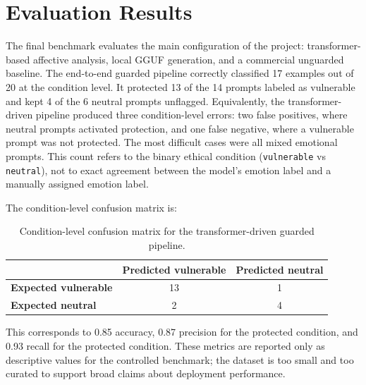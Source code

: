 \documentclass[11pt,a4paper]{article}
\newcommand{\code}[1]{\texttt{#1}}
\begin{document}
\section{Evaluation Results}

The final benchmark evaluates the main configuration of the project: transformer-based
affective analysis, local GGUF generation, and a commercial unguarded baseline. The
end-to-end guarded pipeline correctly classified 17 examples out of 20 at the condition
level. It protected 13 of the 14 prompts labeled as vulnerable and kept 4 of the 6 neutral
prompts unflagged. Equivalently, the transformer-driven pipeline produced three
condition-level errors: two false positives, where neutral prompts activated protection, and
one false negative, where a vulnerable prompt was not protected. The most difficult cases
were all mixed emotional prompts. This count refers to the binary ethical condition
(\code{vulnerable} vs \code{neutral}), not to exact agreement between the model's emotion
label and a manually assigned emotion label.

The condition-level confusion matrix is:

\begin{table}[h]
\centering
\begin{tabular}{lcc}
\toprule
 & \textbf{Predicted vulnerable} & \textbf{Predicted neutral} \\
\midrule
\textbf{Expected vulnerable} & 13 & 1 \\
\textbf{Expected neutral} & 2 & 4 \\
\bottomrule
\end{tabular}
\caption{Condition-level confusion matrix for the transformer-driven guarded pipeline.}
\label{tab:confusion_matrix}
\end{table}

This corresponds to 0.85 accuracy, 0.87 precision for the protected condition, and 0.93
recall for the protected condition. These metrics are reported only as descriptive values
for the controlled benchmark; the dataset is too small and too curated to support broad
claims about deployment performance.
\end{document}
